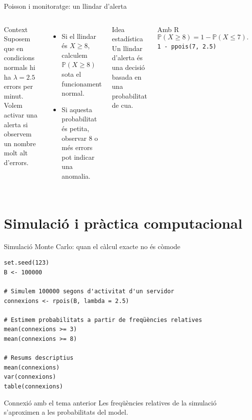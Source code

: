 \documentclass[10pt,aspectratio=169]{beamer}
\newcommand{\Prob}{\mathbb{P}}
\begin{document}
\begin{frame}{Poisson i monitoratge: un llindar d'alerta}
\begin{columns}[T]
\begin{block}{Context}
Suposem que en condicions normals hi ha $\lambda=2.5$ errors per minut.
Volem activar una alerta si observem un nombre molt alt d'errors.
\end{block}
\begin{itemize}
  \item Si el llindar és $X\geq 8$, calculem $\Prob(X\geq 8)$ sota el funcionament normal.
  \item Si aquesta probabilitat és petita, observar $8$ o més errors pot indicar una anomalia.
\end{itemize}
\begin{alertblock}{Idea estadística}
Un llindar d'alerta és una decisió basada en una probabilitat de cua.
\end{alertblock}
\begin{block}{Amb R}
\[
\Prob(X\geq 8)=1-\Prob(X\leq 7).
\]
\texttt{1 - ppois(7, 2.5)}
\end{block}
\end{columns}
\end{frame}

\section{Simulació i pràctica computacional}

\begin{frame}[fragile]{Simulació Monte Carlo: quan el càlcul exacte no és còmode}
\begin{lstlisting}
set.seed(123)
B <- 100000

# Simulem 100000 segons d'activitat d'un servidor
connexions <- rpois(B, lambda = 2.5)

# Estimem probabilitats a partir de freqüències relatives
mean(connexions >= 3)
mean(connexions >= 8)

# Resums descriptius
mean(connexions)
var(connexions)
table(connexions)
\end{lstlisting}

\begin{block}{Connexió amb el tema anterior}
Les freqüències relatives de la simulació s'aproximen a les probabilitats del model.
\end{block}
\end{frame}
\end{document}
